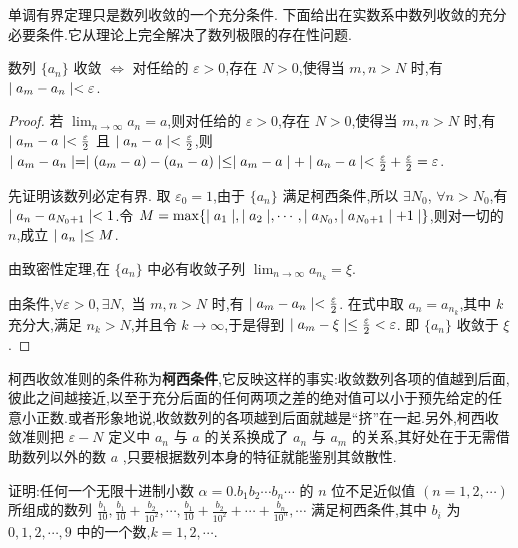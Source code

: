 单调有界定理只是数列收敛的一个充分条件. 下面给出在实数系中数列收敛的充分必要条件.它从理论上完全解决了数列极限的存在性问题.

\begin{theorem}[柯西收敛准则]
    数列 $\{a_n\}$ 收敛 $\iff$ 对任给的 $\varepsilon>0$,存在 $N>0$,使得当 $m,n>N$ 时,有 $\mid a_m-a_n \mid<\varepsilon$.
\end{theorem}

\begin{proof}
    \biyao 若 $\lim_{n\to\infty} a_n=a$,则对任给的 $\varepsilon>0$,存在 $N>0$,使得当 $m,n>N$ 时,有 $\mid a_m-a \mid<\frac{\varepsilon}{2}$ 且 $\mid a_n-a \mid<\frac{\varepsilon}{2}$,则 $\mid a_m-a_n \mid=\mid (a_m-a)-(a_n-a) \mid\le \mid a_m-a \mid+\mid a_n-a \mid<\frac{\varepsilon}{2}+\frac{\varepsilon}{2}=\varepsilon$.

    \chongfen 先证明该数列必定有界. 取 $\varepsilon_0=1$,由于 $\{a_n\}$ 满足柯西条件,所以 $\exists N_0$, $\forall n>N_0$,有 $\mid a_n-a_{N_0+1} \mid<1$.令 $M=\max\{\mid a_1 \mid,\mid a_2 \mid,\cdots,\mid a_{N_0},\mid a_{N_0+1} \mid+1 \mid\}$,则对一切的 $n$,成立 $\mid a_n \mid\le M$.

    由致密性定理,在 $\{a_n\}$ 中必有收敛子列 $\lim_{n\to\infty} a_{n_k}=\xi $.

    由条件,$\forall \varepsilon>0,\exists N,$ 当 $m,n>N$ 时,有 $\mid a_m-a_n \mid<\frac{\varepsilon}{2}$. 在式中取 $a_n=a_{n_k}$,其中 $k$ 充分大,满足 $n_k>N$,并且令 $k\to \infty$,于是得到 $\mid a_m-\xi \mid\le \frac{\varepsilon}{2}<\varepsilon$. 即 $\{a_n\}$ 收敛于 $\xi$.
\end{proof}

柯西收敛准则的条件称为\textbf{柯西条件},它反映这样的事实:收敛数列各项的值越到后面,彼此之间越接近,以至于充分后面的任何两项之差的绝对值可以小于预先给定的任意小正数.或者形象地说,收敛数列的各项越到后面就越是``挤''在一起.另外,柯西收敛准则把 $\varepsilon-N$ 定义中 $a_n$ 与 $a$ 的关系换成了 $a_n$ 与 $a_m$ 的关系,其好处在于无需借助数列以外的数 $a$ ,只要根据数列本身的特征就能鉴别其敛散性.

\begin{example}
    证明:任何一个无限十进制小数 $\alpha=0.b_1b_2\cdots b_n\cdots$ 的 $n$ 位不足近似值 $(n=1,2,\cdots)$ 所组成的数列 $\frac{b_1}{10},\frac{b_1}{10}+\frac{b_2}{10^2},\cdots,\frac{b_1}{10}+\frac{b_2}{10^2}+\cdots+\frac{b_n}{10^n},\cdots$ 满足柯西条件,其中 $b_i$ 为 $0,1,2,\cdots,9$ 中的一个数,$k=1,2,\cdots$.
\end{example}

